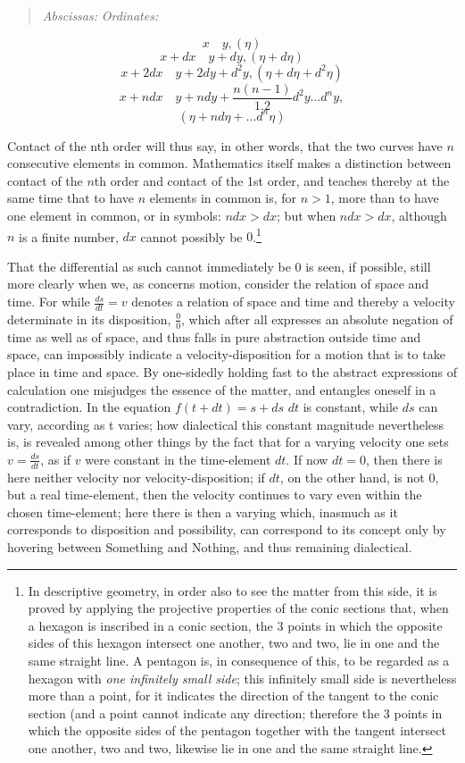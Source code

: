 \documentclass[12pt,a4paper,openany]{book}
\newcommand{\opage}[1]{\marginnote{\footnotesize\textit{[#1]}}}
\begin{document}
\begin{quote}
\emph{Abscissas:} \emph{Ordinates:}
\end{quote}
\[ x \quad y, (\eta) \]
\[ x+dx \quad y+dy, (\eta+d\eta) \]
\[ x+2dx \quad y+2dy+d^{2}y, (\eta+d\eta+d^{2}\eta) \]
\[ x+n dx \quad y+n dy+\frac{n(n-1)}{1.2}d^{2}y\ldots d^{n}y, \]
\[ (\eta+n d\eta+\ldots d^{n}\eta) \]

Contact of the nth order will thus say, in other words, that the two curves have $n$ consecutive elements in common.
Mathematics itself makes a distinction between contact of the $n$th order and contact
of the 1st order, and teaches thereby at the same time that
to have $n$ elements in common is, for $n>1$, more than to have one element in common, or in symbols: $n dx>dx$; but when $n dx>dx$, although $n$ is a finite number, $dx$ cannot possibly be $0$.\footnote[1]{In descriptive geometry, in order also to see the matter from this side, it is proved by applying the projective properties of the conic sections that, when a hexagon is inscribed in a conic section, the 3 points in which the opposite sides of this hexagon intersect one another, two and two, lie in one and the same straight line. A pentagon is, in consequence of this, to be regarded as a hexagon with \emph{one infinitely small side}; this infinitely small side is nevertheless more than a point, for it indicates the direction of the tangent to the conic section (and a point cannot indicate any direction; therefore the 3 points in which the opposite sides of the pentagon together with the tangent intersect one another, two and two, likewise lie in one and the same straight line.}

That the differential as such cannot immediately be $0$ is seen, if possible, still more clearly when we, as concerns
\setcounter{footnote}{0}%
\opage{90}motion, consider the relation of space and time.
For while $\frac{ds}{dt}=v$ denotes a relation of space and
time and thereby a velocity determinate in its disposition, $\frac{0}{0}$, which
after all expresses an absolute negation of time as well as of
space, and thus falls in pure abstraction outside
time and space, can impossibly indicate a velocity-disposition for a motion
that is to take place in time and space. By one-sidedly
holding fast to the abstract expressions of calculation one misjudges the
essence of the matter, and entangles oneself in a contradiction. In the equation $f(t+dt)=s+ds$ $dt$ is constant, while $ds$ can vary, according as t varies;
how dialectical this constant magnitude
nevertheless is, is revealed among other things by the fact that for
a varying velocity one sets $v=\frac{ds}{dt}$, as if $v$ were constant in the time-element $dt$. If now $dt=0$, then there is here neither velocity nor velocity-disposition; if $dt$, on the other hand, is not $0$, but a real time-element, then the velocity continues
to vary even within the chosen time-element; here there is then
a varying which, inasmuch as it corresponds to disposition and possibility, can correspond to its concept only
by hovering between Something and Nothing, and thus remaining
dialectical.
\end{document}
